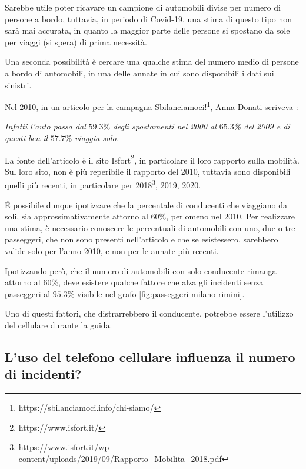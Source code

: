 \documentclass[a4paper,12pt]{report}
\newcommand{\quotestyle}[1]{\textit{#1}}
\begin{document}
Sarebbe utile poter ricavare un campione di automobili divise per 
numero di persone a bordo, tuttavia, in periodo di Covid-19, una stima di questo tipo 
non sarà mai accurata, in quanto la maggior parte delle persone si spostano da sole 
per viaggi (si spera) di prima necessità.

Una seconda possibilità è cercare una qualche stima del numero medio di 
persone a bordo di automobili, in una delle annate in cui sono disponibili i dati 
sui sinistri.

Nel 2010, in un articolo per la campagna 
Sbilanciamoci!\footnote{https://sbilanciamoci.info/chi-siamo/}, 
Anna Donati scriveva \cite{SBILANCIAMOCI:1}: 

\begin{center}
    \quotestyle{Infatti l’auto passa dal} $59.3$\% \quotestyle{degli spostamenti nel 2000 al $65.3$\% del }
    \quotestyle{2009 e di questi ben il} $57.7$\% 
    \quotestyle{viaggia solo.}
\end{center}

La fonte dell'articolo è il sito Isfort\footnote{https://www.isfort.it/}, 
in particolare il loro rapporto sulla mobilità.
Sul loro sito, non è più reperibile il rapporto del 2010, tuttavia sono disponibili 
quelli più recenti, in particolare per 
2018\footnote{\url{https://www.isfort.it/wp-content/uploads/2019/09/Rapporto_Mobilita_2018.pdf}}, 
2019, 2020.

\'E possibile dunque ipotizzare che la percentale di conducenti che viaggiano 
da soli, sia approssimativamente attorno al $60$\%, perlomeno nel 2010.
Per realizzare una stima, è necessario conoscere le percentuali di automobili con uno, 
due o tre passeggeri, che non sono presenti nell'articolo e che se esistessero, sarebbero 
valide solo per l'anno 2010, e non per le annate più recenti.

Ipotizzando però, che il numero di automobili con solo conducente rimanga attorno al 
$60$\%, deve esistere qualche fattore che alza gli incidenti senza passeggeri al 
$95.3$\% visibile nel grafo \ref{fig:passeggeri-milano-rimini}.

Uno di questi fattori, che distrarrebbero il conducente, potrebbe essere l'utilizzo 
del cellulare durante la guida.

\subsection{L'uso del telefono cellulare influenza il numero di incidenti?}
\end{document}
